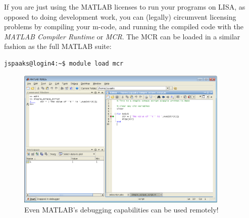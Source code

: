 If you are just using the MATLAB licenses to run your programs on LISA, as opposed to doing development work, you can (legally) circumvent licensing problems by compiling your m-code, and running the compiled code with the \textit{MATLAB Compiler Runtime} or \textit{MCR}. The MCR can be loaded in a similar fashion as the full MATLAB suite:
\begin{lstlisting}[style=basic,style=bash]
jspaaks@login4:~$ module load mcr
\end{lstlisting}

\begin{figure}[!htb]
  \centering
    \includegraphics[width=0.9\textwidth]{./../eps/matlab-remote-debugging.eps}
  \caption{Even MATLAB's debugging capabilities can be used remotely!}
  \label{fig:matlab-remote-debugging}
\end{figure}


